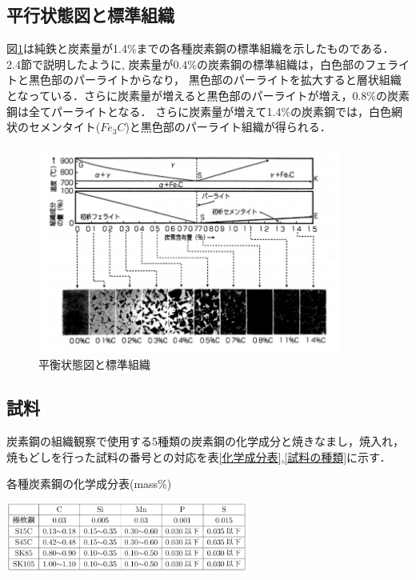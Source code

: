 \documentclass[a4paper,11pt,uplatex]{jsarticle}
\begin{document}
\subsection{平行状態図と標準組織}
図\ref{標準組織}は純鉄と炭素量が1.4\%までの各種炭素鋼の標準組織を示したものである．
2.4節で説明したように, 炭素量が0.4\%の炭素鋼の標準組織は，白色部のフェライトと黒色部のパーライトからなり，
黒色部のパーライトを拡大すると層状組織となっている．さらに炭素量が増えると黒色部のパーライトが増え，0.8\%の炭素鋼は全てパーライトとなる．
さらに炭素量が増えて1.4\%の炭素鋼では，白色網状のセメンタイト($Fe_3C$)と黒色部のパーライト組織が得られる．

\begin{figure}
  \begin{center}
    \includegraphics[width = 10cm]{画像/標準組織.png}
    \caption{平衡状態図と標準組織}
    \label{標準組織}
  \end{center}
\end{figure}

\subsection{試料}
炭素鋼の組織観察で使用する5種類の炭素鋼の化学成分と焼きなまし，焼入れ，焼もどしを行った試料の番号との対応を表\ref{化学成分表},\ref{試料の種類}に示す．

\begin{table}[H]
  \begin{center}
    \caption{各種炭素鋼の化学成分表(mass\%)}
    \includegraphics[width = 8cm]{画像/化学成分表.png}
    \label{化学成分表}
  \end{center}
\end{table}
\end{document}
